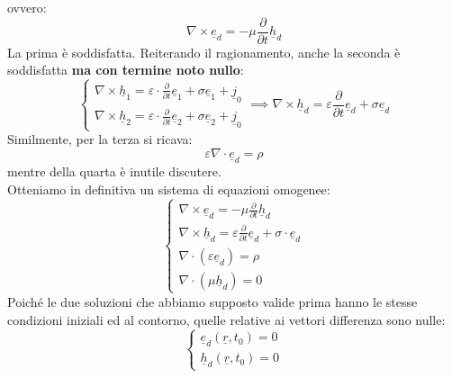 \documentclass{book}
\begin{document}
        ovvero:
        \begin{equation}
            \nabla \times \underline{e}_{d} = - \mu \frac{\partial}{\partial t} \underline{h}_{d}
        \end{equation}
        La prima è soddisfatta. Reiterando il ragionamento, anche la seconda è soddisfatta \textbf{ma con termine noto nullo}:
        \begin{equation}
        \begin{cases}
            \nabla \times \underline{h}_{1} = \displaystyle \varepsilon \cdot \frac{\partial}{\partial t} \underline{e}_{1} + \sigma \underline{e}_{1} + \underline{j}_{0} \\
            
            \nabla \times \underline{h}_{2} = \displaystyle \varepsilon \cdot \frac{\partial}{\partial t} \underline{e}_{2} + \sigma \underline{e}_{2} + \underline{j}_{0}
        \end{cases} \implies \nabla  \times \underline{h}_{d} = \varepsilon \frac{\partial}{\partial t} \underline{e}_{d} + \sigma \underline{e}_{d}
        \end{equation}
        Similmente, per la terza si ricava:
        \begin{equation}
            \varepsilon \nabla \cdot \underline{e}_{d} = \rho
        \end{equation}
        mentre della quarta è inutile discutere. \\
        Otteniamo in definitiva un sistema di equazioni omogenee:
        \begin{equation}
        \begin{cases}
            \nabla \times \underline{e}_{d} = - \displaystyle \mu \frac{\partial}{\partial t} \underline{h}_{d} \\
            \nabla \times \underline{h}_{d} = \displaystyle \varepsilon \frac{\partial}{\partial t} \underline{e}_{d}+\sigma \cdot \underline{e}_{d} \\
            \nabla \cdot (\varepsilon \underline{e}_{d}) = \rho \\
            \nabla \cdot (\mu \underline{h}_{d} )= 0
        \end{cases}
        \end{equation}
        Poiché le due soluzioni che abbiamo supposto valide prima hanno le stesse condizioni iniziali ed al contorno, quelle relative ai vettori differenza sono nulle:
        \begin{equation}
            \begin{cases}
                \underline{e}_{d} (\underline{r},t_{0}) = 0 \\
                \underline{h}_{d} (\underline{r},t_{0})=0
            \end{cases}
        \end{equation}
\end{document}
